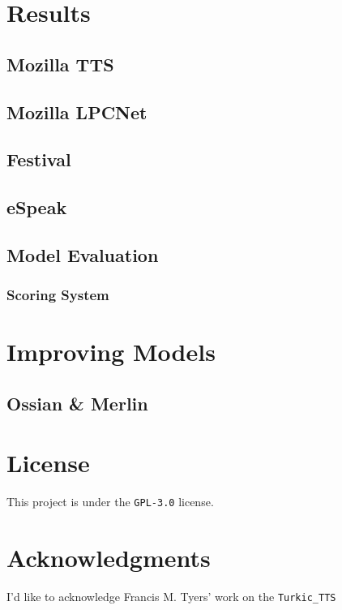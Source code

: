 \documentclass[11pt,a4paper]{article}
\begin{document}
\section{Results}\label{sect:results}
\subsection{Mozilla TTS}
\subsection{Mozilla LPCNet}
\subsection{Festival}
\subsection{eSpeak}

\subsection{Model Evaluation}\label{ssec:evaluation}

\subsubsection{Scoring System}\label{ssec:score}

\section{Improving Models}\label{sec:improving}
\subsection{Ossian \& Merlin}\label{ssec:improveOssian}

\section*{License}
This project is under the \texttt{GPL-3.0} license.

\section*{Acknowledgments}
I'd like to acknowledge Francis M. Tyers' work on the \texttt{Turkic\_TTS}

%
%


\end{document}
